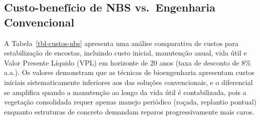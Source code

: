 \documentclass[
  portuguese,
  11pt,
  a4paper,
  open=any]{scrbook}
\begin{document}
\subsection{Custo-benefício de NBS vs.~Engenharia
Convencional}\label{custo-benefuxedcio-de-nbs-vs.-engenharia-convencional}

A Tabela~\ref{tbl-custos-nbs} apresenta uma análise comparativa de
custos para estabilização de encostas, incluindo custo inicial,
manutenção anual, vida útil e Valor Presente Líquido (VPL) em horizonte
de 20 anos (taxa de desconto de 8\% a.a.). Os valores demonstram que as
técnicas de bioengenharia apresentam custos iniciais sistematicamente
inferiores aos das soluções convencionais, e o diferencial se amplifica
quando a manutenção ao longo da vida útil é contabilizada, pois a
vegetação consolidada requer apenas manejo periódico (roçada, replantio
pontual) enquanto estruturas de concreto demandam reparos
progressivamente mais caros.
\end{document}
